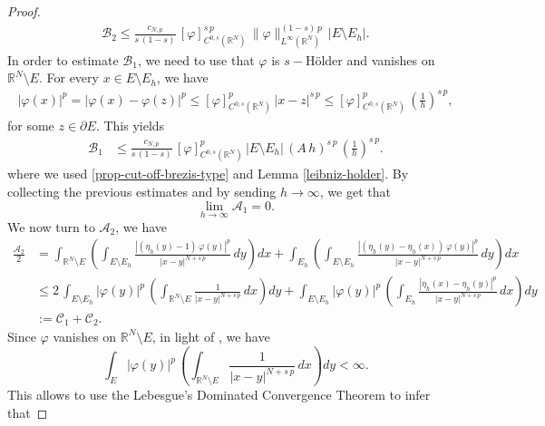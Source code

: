\documentclass{amsart}
\theoremstyle{definition}
\numberwithin{equation}{section}
\begin{document}
\begin{proof}
\[\begin{split}
			\mathcal{B}_2 \le \frac{c_{N,p}}{s\,(1-s)}\,[\varphi]^{s\,p}_{C^{0,s}(\mathbb{R}^N)}\,\|\varphi\|^{(1-s)\,p}_{L^\infty(\mathbb{R}^N)}\, |E \setminus E_h|.
		\end{split}
		\]
		In order to estimate $\mathcal{B}_1$, we need to use that $\varphi$ is $s-$H\"older and vanishes on $\mathbb{R}^N \setminus E$. For every $x \in E \setminus E_{h}$, we have
		\begin{equation} \label{per-favore-funziona}
			\begin{split}
				|\varphi(x)|^p = |\varphi(x) - \varphi(z)|^p \le [\varphi]^p_{C^{0,s}(\mathbb{R}^N)}\,|x-z|^{s\,p} \le [\varphi]^p_{C^{0,s}(\mathbb{R}^N)}\,\left(\frac{1}{h}\right)^{s\,p}, 
			\end{split}
		\end{equation}
		for some $ z \in \partial E$. 
		This yields
		\[
		\begin{split}
			\mathcal{B}_1 &\le  \frac{c_{N,p}}{s\,(1-s)}\,[\varphi]^p_{C^{0,s}(\mathbb{R}^N)}\,|E \setminus E_h|\,(A\,h)^{s\,p}\,\left(\frac{1}{h}\right)^{s\,p}.  
		\end{split}
		\]
		where we used \eqref{prop-cut-off-brezis-type} and Lemma \ref{leibniz-holder}. By collecting the previous estimates and by sending $h \to \infty$, we get that 
		\begin{equation} \label{limite-1}
			\lim_{h \to \infty} \mathcal{A}_1 = 0. 
		\end{equation} 
		We now turn to $\mathcal{A}_2$, we have 
		\[
		\begin{split}
			\frac{\mathcal{A}_2}{2} &= \int_{\mathbb{R}^N \setminus E}\left(\int_{E \setminus E_{h}} \frac{|(\eta_h(y) -1 )\,\varphi(y)|^p}{|x-y|^{N+s\,p}}\,dy\right)dx + \int_{E_h}\left(\int_{E \setminus E_{h}} \frac{|(\eta_h(y) - \eta_h(x) )\,\varphi(y)|^p}{|x-y|^{N+s\,p}}\,dy\right)dx\\
			&\le 2\,\int_{E \setminus E_h} |\varphi(y)|^p\,\left(\int_{\mathbb{R}^N \setminus E} \frac{1}{|x-y|^{N+s\,p}}\,dx\right)dy + \int_{E \setminus E_h} |\varphi(y)|^p\,\left(\int_{E_{h}} \frac{ |\eta_h(x) - \eta_h(y)|^p}{|x-y|^{N+s\,p}}\,dx\right)dy \\
			&:= \mathcal{C}_1 + \mathcal{C}_2.
		\end{split}
		\]
		Since $\varphi$ vanishes on $\mathbb{R}^N \setminus E$, in light of \cite[Theorem 6.97]{Leoni_fractional}, we have  
		\[
		\int_{E} |\varphi(y)|^p\,\left(\int_{\mathbb{R}^N \setminus E} \frac{1}{|x-y|^{N+s\,p}}\,dx\right)dy < \infty.
		\]
		This allows to use the Lebesgue's Dominated Convergence Theorem to infer that 

\end{proof}
\end{document}

